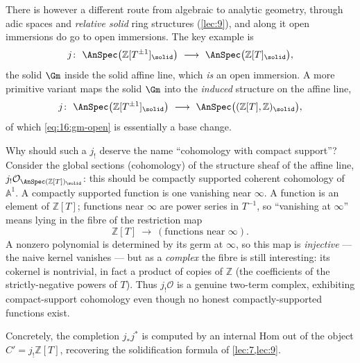 \begin{example}
\label{ex:16:open-example}
There is however a different route from algebraic to analytic geometry, through adic
spaces and \emph{relative solid} ring structures (\cref{lec:9}), and along it open
immersions do go to open immersions. The key example is
\begin{equation}
\label{eq:16:gm-open}
j\colon\ \AnSpec\bigl(\mathbb{Z}[T^{\pm1}]_\solid\bigr)\ \longrightarrow\ \AnSpec\bigl(\mathbb{Z}[T]_\solid\bigr),
\end{equation}
the solid $\Gm$ inside the solid affine line, which \emph{is} an open immersion. A
more primitive variant maps the solid $\Gm$ into the \emph{induced} structure on the
affine line,
\begin{equation*}
j\colon\ \AnSpec\bigl(\mathbb{Z}[T^{\pm1}]_\solid\bigr)\ \longrightarrow\ \AnSpec\bigl((\mathbb{Z}[T],\mathbb{Z})_\solid\bigr),
\end{equation*}
of which \eqref{eq:16:gm-open} is essentially a base change.
\end{example}

\begin{remark}
\label{rmk:16:compact-support-picture}
Why should such a $j_!$ deserve the name ``cohomology with compact support''?
Consider the global sections (cohomology) of the structure sheaf of the affine line,
$j_!\mathcal{O}_{\AnSpec(\mathbb{Z}[T])_\solid}$: this should be compactly supported
coherent cohomology of $\mathbb{A}^1$. A compactly supported function is one vanishing
near $\infty$. A function is an element of $\mathbb{Z}[T]$; functions near $\infty$ are
power series in $T^{-1}$, so ``vanishing at $\infty$'' means lying in the fibre of the
restriction map
\begin{equation*}
\mathbb{Z}[T]\ \longrightarrow\ (\text{functions near }\infty).
\end{equation*}
A nonzero polynomial is determined by its germ at $\infty$, so this map is
\emph{injective} --- the naive kernel vanishes --- but as a \emph{complex} the fibre is
still interesting: its cokernel is nontrivial, in fact a product of copies of
$\mathbb{Z}$ (the coefficients of the strictly-negative powers of $T$). Thus
$j_!\mathcal{O}$ is a genuine two-term complex, exhibiting compact-support cohomology
even though no honest compactly-supported functions exist.
\end{remark}

Concretely, the completion $j_*j^*$ is computed by an internal Hom out of the object
$C'=j_!\mathbb{Z}[T]$, recovering the solidification formula of \cref{lec:7,lec:9}.

